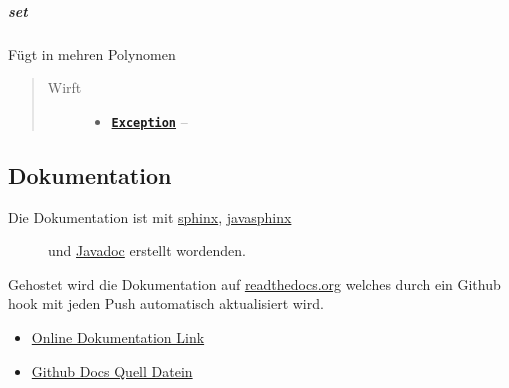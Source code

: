 \documentclass[letterpaper,10pt,ngerman]{sphinxmanual}
\begin{document}
\subparagraph{set}
\label{com/linuxluigi/polynomial/test/PolynomialTest:set}

\begin{fulllineitems}
\label{com/linuxluigi/polynomial/test/PolynomialTest:com.linuxluigi.polynomial.test.PolynomialTest.set()}
Fügt in mehren Polynomen
\begin{quote}\begin{description}
\item[{Wirft}] \leavevmode\begin{itemize}
\item {} 
\href{http://docs.oracle.com/javase/8/docs/api/java/lang/Exception.html}{\textbf{\texttt{Exception}}} -- 

\end{itemize}

\end{description}\end{quote}

\end{fulllineitems}



\subsection{Dokumentation}
\label{docs:dokumentation}\label{docs::doc}\begin{description}
\item[{Die Dokumentation ist mit \href{http://www.sphinx-doc.org/en/1.4.8/}{sphinx}, \href{https://bronto.github.io/javasphinx/}{javasphinx}}] \leavevmode
und \href{https://en.wikipedia.org/wiki/Javadoc}{Javadoc}  erstellt wordenden.

\end{description}

Gehostet wird die Dokumentation auf \href{https://readthedocs.org/}{readthedocs.org} welches durch ein Github hook mit jeden Push automatisch aktualisiert wird.
\begin{itemize}
\item {} 
\href{https://readthedocs.org/projects/polynomials-calculator/}{Online Dokumentation Link}

\item {} 
\href{https://github.com/linuxluigi/polynomials-calculator/tree/master/docs}{Github Docs Quell Datein}

\end{itemize}
\end{document}
